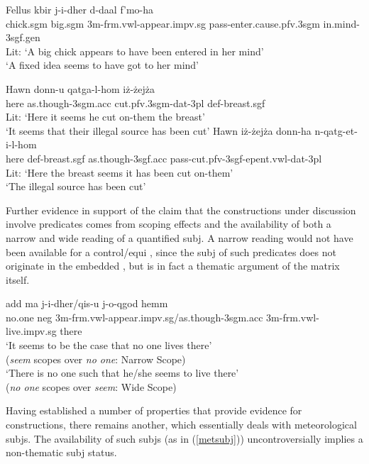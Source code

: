 \documentclass[output=paper]{LSP/langsci}
\begin{document}
\newpage 
\ex
\gll Fellus kbir j-i-dher d-da\textcrh\textcrh al f'mo\textcrh\textcrh-ha\\
chick.{\sc sgm} big.{\sc sgm} 3{\sc m}-{\sc frm.vwl}-appear.{\sc impv.sg} {\sc pass}-enter.{\sc cause.pfv.3sgm} in.mind-{\sc 3sgf.gen}\\
\glt Lit: `A big chick appears to have been entered in her mind'\\
\glt `A fixed idea seems to have got to her mind'
\z
\z

\ea
\ea
\gll Hawn donn-u qatg\textcrh a-l-hom i{\.z}-{\.z}ej{\.z}a\\
here as.though-{\sc 3sgm.acc} cut.{\sc pfv.3sgm-dat-3pl} {\sc def-}breast.{\sc sgf}\\
\glt Lit: `Here it seems he cut on-them the breast'\\
\glt `It seems that their illegal source has been cut'
\ex
\gll Hawn i{\.z}-{\.z}ej{\.z}a donn-ha n-qatg\textcrh-et-i-l-hom\\
here {\sc def-}breast.{\sc sgf} as.though-{\sc 3sgf.acc} {\sc pass}-cut.{\sc pfv-3sgf-epent.vwl-dat-3pl}\\
\glt Lit: `Here the breast seems it has been cut on-them'\\
\glt `The illegal source has been cut'
\z
\z

Further evidence in support of the claim that the constructions under discussion involve  predicates comes from scoping effects and the availability of both a narrow and wide reading of a quantified {\sc subj}. A narrow reading would not have been available for a control/equi , since the {\sc subj} of such predicates does not originate in the embedded , but is in fact a thematic argument of the matrix itself.

\ea
\gll \textcrh add ma j-i-dher/qis-u j-o-qg\textcrh od hemm\\
no.one {\sc neg} 3{\sc m}-{\sc frm.vwl}-appear.{\sc impv.sg}/as.though-{\sc 3sgm.acc} 3{\sc m}-{\sc frm.vwl}-live.{\sc impv.sg} there\\
\glt `It seems to be the case that no one lives there'\\ \glt \hfill{(\emph{seem} scopes over \emph{no one}: Narrow Scope)}\\
\glt `There is no one such that he/she seems to live there'\\
\glt \hfill{(\emph{no one} scopes over \emph{seem}: Wide Scope)}
\z 

Having established a number of properties that provide evidence for  constructions, there remains another, which essentially deals with meteorological {\sc subj}s. The availability of such {\sc subj}s (as in (\ref{metsubj})) uncontroversially implies a non-thematic {\sc subj} status.
\end{document}
